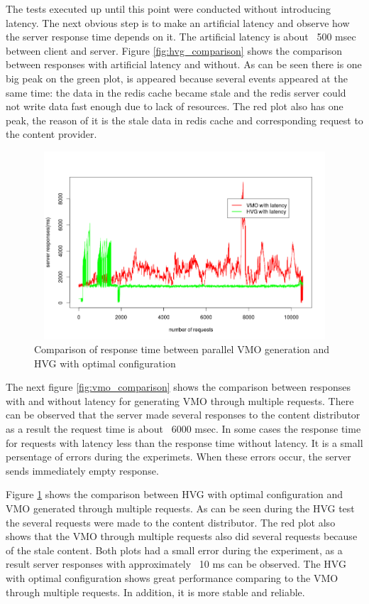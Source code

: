 The tests executed up until this point were conducted without introducing latency. The next obvious step is to make an artificial latency and observe how the server response time depends on it. The artificial latency is about ~500 msec between client and server. Figure \ref{fig:hvg_comparison} shows the comparison between responses with artificial latency and without. As can be seen there is one big peak on the green plot, is appeared because several events appeared at the same time: the data in the redis cache became stale and the redis server could not write data fast enough due to lack of resources. The red plot also has one peak, the reason of it is the stale data in redis cache and corresponding request to the content provider.

\begin{figure}[h!]
    \centering
    \includegraphics[width=15cm,height=7cm,keepaspectratio]{images/hvg_vmo_latency_comparison.png}
    \caption{Comparison of response time between parallel VMO generation and HVG with optimal configuration}
    \label{fig:hvg_vmo_latency_comp}
\end{figure}


The next figure \ref{fig:vmo_comparison} shows the comparison between responses with and without latency for generating VMO through multiple requests. There can be observed that the server made several responses to the content distributor as a result the request time is about ~6000 msec. In some cases the response time for requests with latency less than the response time without latency. It is a small persentage of errors during the experimets. When these errors occur, the server sends immediately empty response.


Figure \ref{fig:hvg_vmo_latency_comp} shows the comparison between HVG with optimal configuration and VMO generated through multiple requests. As can be seen during the HVG test the several requests were made to the content distributor. The red plot also shows that the VMO through multiple requests also did several requests because of the stale content. Both plots had a small error during the experiment, as a result server responses with approximately ~10 ms can be observed. The HVG with optimal configuration shows great performance comparing to the VMO through multiple requests. In addition, it is more stable and reliable. 




\newpage


